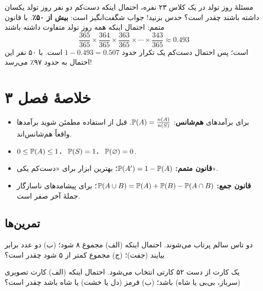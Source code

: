 \begin{moreinfo}{مسئلهٔ روز تولد}
در یک کلاس ۲۳ نفره، احتمال اینکه دست‌کم دو نفر روز تولد یکسان داشته باشند چقدر است؟ حدس بزنید! جواب شگفت‌انگیز است: \textbf{بیش از ۵۰٪}. با قانون متمم: احتمال اینکه همه روز تولد متفاوت داشته باشند
\[ \frac{365}{365}\times\frac{364}{365}\times\frac{363}{365}\times\cdots\times\frac{343}{365}\approx0.493 \]
است؛ پس احتمال دست‌کم یک تکرار حدود $1-0.493=0.507$ است. با ۵۰ نفر این احتمال به حدود ۹۷٪ می‌رسد!
\end{moreinfo}

\section*{خلاصهٔ فصل ۳}

\begin{summary}[title={\leavevmode\boxicon{accent}{$\Sigma$}\ \ خلاصهٔ فصل}]
\begin{itemize}
  \item برای برآمدهای \textbf{هم‌شانس}: $\P(A)=\frac{n(A)}{n(S)}$. قبل از استفاده مطمئن شوید برآمدها واقعاً هم‌شانس‌اند.
  \item $0\le\P(A)\le1$، \ $\P(S)=1$، \ $\P(\varnothing)=0$.
  \item \textbf{قانون متمم:} $\P(A')=1-\P(A)$؛ بهترین ابزار برای «دست‌کم یکی».
  \item \textbf{قانون جمع:} $\P(A\cup B)=\P(A)+\P(B)-\P(A\cap B)$؛ برای پیشامدهای ناسازگار جملهٔ آخر صفر است.
\end{itemize}
\end{summary}

\subsection*{تمرین‌ها}

\begin{exercise}
دو تاس سالم پرتاب می‌شوند. احتمال اینکه (الف) مجموع ۸ شود؛ (ب) دو عدد برابر بیایند (جفت)؛ (ج) مجموع کمتر از ۵ شود چقدر است؟
\end{exercise}

\begin{exercise}
یک کارت از دست ۵۲ کارتی انتخاب می‌شود. احتمال اینکه (الف) کارت تصویری (سرباز، بی‌بی یا شاه) باشد؛ (ب) قرمز (دل یا خشت) یا شاه باشد چقدر است؟
\end{exercise}

